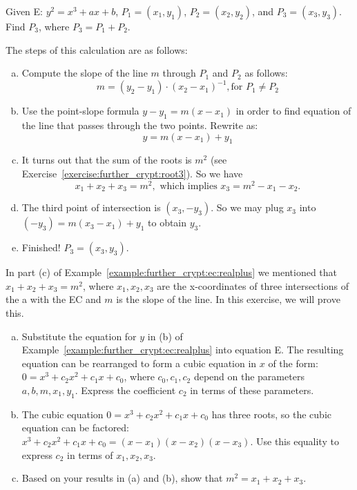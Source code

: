 \begin{example}\label{example:further_crypt:ec:realplus}
Given E: $y^2 = x^3 + ax + b$, $P_1 = (x_1, y_1)$, $P_2 = (x_2, y_2)$, and $P_3 = (x_3, y_3)$. Find $P_3$, where $ P_3 =  P_1 + P_2$.

\noindent
The steps of this calculation are as follows:
\begin{enumerate}[(a)]
\item
Compute the slope of the line $m$ through $P_1$ and $P_2$ as follows:  \[ m =(y_2 - y_1) \cdot (x_2- x_1)^{-1}, \text{for } P_1 \neq P_2  \] 
\item
Use the point-slope formula $y - y_1 = m(x-x_1)$  in order to find equation of the line that passes through the two points.  Rewrite as: \[y  = m(x-x_1) + y_1\]
\item
It turns out that the sum of the roots is $m^2$ (see Exercise~\ref{exercise:further_crypt:root3}). So we have
\[x_1 + x_2 + x_3 = m^2, \text{ which implies } x_3 =   m^2 -  x_1 - x_2.\]
\item  The third point of intersection is $(x_3, -y_3)$. So  we may plug $x_3$ into $(-y_3)  = m(x_3-x_1) + y_1$ to obtain $y_3$. 
\item Finished!  $P_3 = (x_3,y_3)$.
\end{enumerate}
 \end{example} 

\begin{exercise}\label{exercise:further_crypt:root3}
In part (c) of Example~\ref{example:further_crypt:ec:realplus} we mentioned that $x_1+x_2+x_3=m^2$, where $x_1,x_2,x_3$ are the x-coordinates of three intersections of the a with the EC and $m$ is the slope of the line.  In this exercise, we will prove this.
\begin{enumerate}[(a)]
\item
Substitute the equation for $y$ in (b) of Example~\ref{example:further_crypt:ec:realplus} into equation E. The resulting equation can be rearranged to form a cubic equation in $x$ of the form: $0 = x^3 + c_2 x^2 + c_1 x + c_0$, where $c_0,c_1, c_2$ depend on the parameters $a,b,m,x_1,y_1$. Express the coefficient $c_2$ in terms of these parameters.
\item
The cubic equation $0 = x^3 + c_2 x^2 + c_1 x + c_0$ has three roots, so the cubic equation can be factored:  $x^3 + c_2 x^2 + c_1 x + c_0 = (x-x_1)(x-x_2)(x-x_3)$. Use this equality to express $c_2$ in terms of $x_1, x_2, x_3$.
\item
Based on your results in (a) and (b), show that $m^2 = x_1 + x_2 + x_3$.
\end{enumerate}
\end{exercise}

